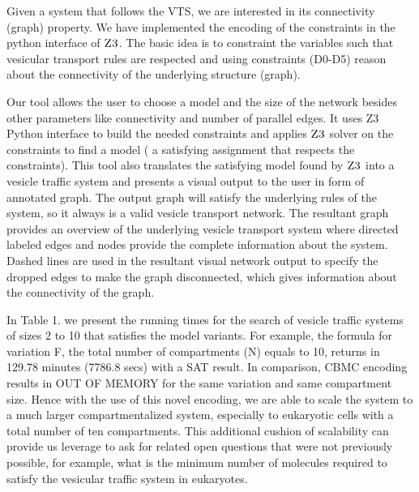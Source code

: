Given a system that follows the VTS, we are interested in its connectivity (graph) property. We have implemented the encoding of the constraints in the python interface of $\textsc{Z3}$. The basic idea is to constraint the variables such that vesicular transport rules are respected and using constraints (D0-D5) reason about the connectivity of the underlying structure (graph).



%
Our tool allows the user to choose a model and the size of the network besides other parameters like connectivity and number of parallel edges. It uses Z3 Python interface to build the needed constraints and applies $\textsc{Z3}$ solver on the constraints to find a model ( a satisfying assignment that respects the constraints). This tool also translates the satisfying model found by $\textsc{Z3}$ into a vesicle traffic system and presents a visual output to the user in form of annotated graph. The output graph will satisfy the underlying rules of the system, so it always is a valid vesicle transport network. The resultant graph provides an overview of the underlying vesicle transport system where directed labeled edges and nodes provide the complete information about the system. Dashed lines are used in the resultant visual network output to specify the dropped edges to make the graph disconnected, which gives information about the connectivity of the graph.


%
In Table 1. 
we present the running times for the search of vesicle traffic systems of sizes 2 to 10 that satisfies the model variants. For example, the formula for variation F, the total number of compartments (N) equals to 10, returns in 129.78 minutes (7786.8 secs) with a SAT result. In comparison, CBMC encoding results in OUT OF MEMORY for the same variation and same compartment size. Hence with the use of this novel encoding, we are able to scale the system to a much larger compartmentalized system, especially to eukaryotic cells with a total number of ten compartments. This additional cushion of scalability can provide us leverage to ask for related open questions that were not previously possible, for example, what is the minimum number of molecules required to satisfy the vesicular traffic system in eukaryotes.

